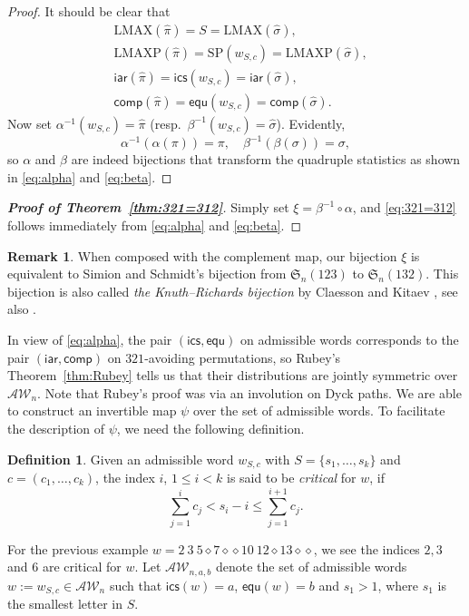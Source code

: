 \documentclass[12pt]{amsart}
\numberwithin{equation}{section}
\theoremstyle{plain}
\theoremstyle{definition}
\newtheorem{Def}[theorem]{Definition}
\newtheorem{remark}[theorem]{Remark}
\def\S{\mathfrak{S}}
\def\iar{\mathsf{iar}}
\def\comp{\mathsf{comp}}
\def\LMAX{\mathrm{LMAX}}
\def\LMAXP{\mathrm{LMAXP}}
\def\AW{\mathcal{AW}}
\def\ics{\mathsf{ics}}
\def\equ{\mathsf{equ}}
\def\SP{\mathrm{SP}}
\begin{document}
\begin{proof}
It should be clear that
\begin{align*}
&\LMAX(\hat\pi)=S=\LMAX(\hat\sigma),\\
&\LMAXP(\hat\pi)=\SP(w_{S,c})=\LMAXP(\hat\sigma),\\
&\iar(\hat\pi)=\ics(w_{S,c})=\iar(\hat\sigma),\\
&\comp(\hat\pi)=\equ(w_{S,c})=\comp(\hat\sigma).
\end{align*}
Now set $\alpha^{-1}(w_{S,c})=\hat\pi$ (resp.~$\beta^{-1}(w_{S,c})=\hat\sigma$). Evidently, $$\alpha^{-1}(\alpha(\pi))=\pi,\quad \beta^{-1}(\beta(\sigma))=\sigma,$$
so $\alpha$ and $\beta$ are indeed bijections that transform the quadruple statistics as shown in \eqref{eq:alpha} and \eqref{eq:beta}.
\end{proof}

\begin{proof}[{\bf Proof of Theorem~\ref{thm:321=312}}]
Simply set $\xi=\beta^{-1}\circ \alpha$, and \eqref{eq:321=312} follows immediately from \eqref{eq:alpha} and \eqref{eq:beta}.
\end{proof}

\begin{remark}
When composed with the complement map, our bijection $\xi$ is equivalent to Simion and Schmidt's \cite{SS} bijection from $\S_n(123)$ to $\S_n(132)$. This bijection is also called {\em the Knuth--Richards bijection} by Claesson and Kitaev \cite{CK}, see also \cite{doy}.
\end{remark}

In view of \eqref{eq:alpha}, the pair $(\ics,\equ)$ on admissible words corresponds to the pair $(\iar,\comp)$ on $321$-avoiding permutations, so Rubey's Theorem~\ref{thm:Rubey} tells us that their distributions are jointly symmetric over $\AW_n$. Note that Rubey's proof was via an involution on Dyck paths. We are able to construct an invertible map $\psi$ over the set of admissible words. To facilitate the description of $\psi$, we need the following definition.
\begin{Def}\label{critical}
Given an admissible word $w_{S,c}$ with $S=\{s_1,\ldots,s_k\}$ and $c=(c_1,\ldots,c_k)$, the index $i$, $1\le i< k$ is said to be {\em critical} for $w$, if $$\sum_{j=1}^{i}c_j< s_i-i\le \sum_{j=1}^{i+1}c_j.$$
\end{Def}

For the previous example $w=2\:3\:5\diamond7\diamond \diamond 10\:12\diamond 13\diamond\diamond$, we see the indices $2,3$ and $6$ are critical for $w$. Let $\AW_{n,a,b}$ denote the set of admissible words $w:=w_{S,c}\in\AW_n$ such that $\ics(w)=a$, $\equ(w)=b$ and $s_1>1$, where $s_1$ is the smallest letter in $S$. 
\end{document}
